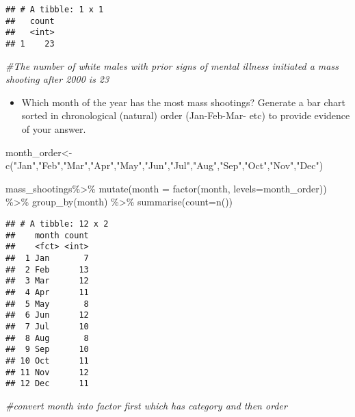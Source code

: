 \documentclass[
]{article}
\newenvironment{Shaded}{\begin{snugshade}}{\end{snugshade}}
\newcommand{\AttributeTok}[1]{\textcolor[rgb]{0.77,0.63,0.00}{#1}}
\newcommand{\CommentTok}[1]{\textcolor[rgb]{0.56,0.35,0.01}{\textit{#1}}}
\newcommand{\FunctionTok}[1]{\textcolor[rgb]{0.00,0.00,0.00}{#1}}
\newcommand{\NormalTok}[1]{#1}
\newcommand{\OtherTok}[1]{\textcolor[rgb]{0.56,0.35,0.01}{#1}}
\newcommand{\SpecialCharTok}[1]{\textcolor[rgb]{0.00,0.00,0.00}{#1}}
\newcommand{\StringTok}[1]{\textcolor[rgb]{0.31,0.60,0.02}{#1}}
\providecommand{\tightlist}{%
  \setlength{\itemsep}{0pt}\setlength{\parskip}{0pt}}
\begin{document}
\begin{verbatim}
## # A tibble: 1 x 1
##   count
##   <int>
## 1    23
\end{verbatim}

\begin{Shaded}
\begin{Highlighting}[]
\CommentTok{\#The number of white males with prior signs of mental illness initiated a mass shooting after 2000 is 23}
\end{Highlighting}
\end{Shaded}

\begin{itemize}
\tightlist
\item
  Which month of the year has the most mass shootings? Generate a bar
  chart sorted in chronological (natural) order (Jan-Feb-Mar- etc) to
  provide evidence of your answer.
\end{itemize}

\begin{Shaded}
\begin{Highlighting}[]
\NormalTok{month\_order}\OtherTok{\textless{}{-}}\FunctionTok{c}\NormalTok{(}\StringTok{"Jan"}\NormalTok{,}\StringTok{"Feb"}\NormalTok{,}\StringTok{"Mar"}\NormalTok{,}\StringTok{"Apr"}\NormalTok{,}\StringTok{"May"}\NormalTok{,}\StringTok{"Jun"}\NormalTok{,}\StringTok{"Jul"}\NormalTok{,}\StringTok{"Aug"}\NormalTok{,}\StringTok{"Sep"}\NormalTok{,}\StringTok{"Oct"}\NormalTok{,}\StringTok{"Nov"}\NormalTok{,}\StringTok{"Dec"}\NormalTok{)}

\NormalTok{mass\_shootings}\SpecialCharTok{\%\textgreater{}\%} 
  \FunctionTok{mutate}\NormalTok{(}\AttributeTok{month =} \FunctionTok{factor}\NormalTok{(month, }\AttributeTok{levels=}\NormalTok{month\_order)) }\SpecialCharTok{\%\textgreater{}\%} 
  \FunctionTok{group\_by}\NormalTok{(month) }\SpecialCharTok{\%\textgreater{}\%} 
  \FunctionTok{summarise}\NormalTok{(}\AttributeTok{count=}\FunctionTok{n}\NormalTok{()) }
\end{Highlighting}
\end{Shaded}

\begin{verbatim}
## # A tibble: 12 x 2
##    month count
##    <fct> <int>
##  1 Jan       7
##  2 Feb      13
##  3 Mar      12
##  4 Apr      11
##  5 May       8
##  6 Jun      12
##  7 Jul      10
##  8 Aug       8
##  9 Sep      10
## 10 Oct      11
## 11 Nov      12
## 12 Dec      11
\end{verbatim}

\begin{Shaded}
\begin{Highlighting}[]
\CommentTok{\#convert month into factor first which has category and then order}
\end{Highlighting}
\end{Shaded}
\end{document}
